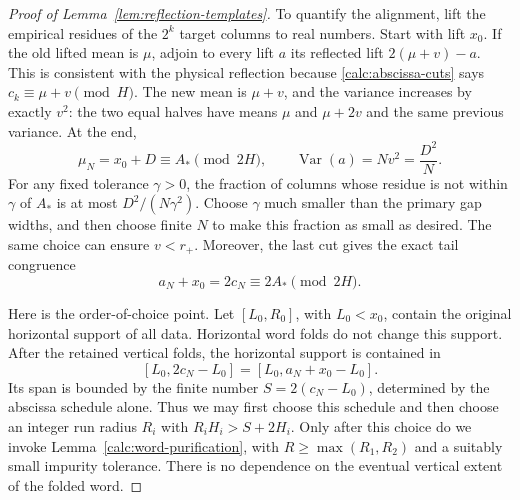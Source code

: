 \begin{proof}[Proof of Lemma~\ref{lem:reflection-templates}]
To quantify the alignment, lift the empirical residues of the
$2^k$ target columns to real numbers. Start with lift $x_0$. If
the old lifted mean is $\mu$, adjoin to every lift $a$ its reflected
lift $2(\mu+v)-a$. This is consistent with the physical reflection
because \eqref{calc:abscissa-cuts} says $c_k\equiv\mu+v\pmod H$.
The new mean is $\mu+v$, and the variance increases by exactly
$v^2$: the two equal halves have means $\mu$ and $\mu+2v$ and
the same previous variance. At the end,
\begin{equation}
 \mu_N=x_0+D\equiv A_*\pmod{2H},
 \qquad \operatorname{Var}(a)=Nv^2=\frac{D^2}{N}.
 \label{calc:abscissa-variance}
\end{equation}
For any fixed tolerance $\gamma>0$, the fraction of columns whose
residue is not within $\gamma$ of $A_*$ is at most
$D^2/(N\gamma^2)$. Choose $\gamma$ much smaller than the primary
gap widths, and then choose finite $N$ to make this fraction as
small as desired. The same choice can ensure $v<r_+$. Moreover,
the last cut gives the exact tail congruence
\begin{equation}
 a_N+x_0=2c_N\equiv2A_*\pmod{2H}.
 \label{calc:abscissa-tail-residue}
\end{equation}

Here is the order-of-choice point. Let $[L_0,R_0]$, with
$L_0<x_0$, contain the original horizontal support of all data.
Horizontal word folds do not change this support. After the
retained vertical folds, the horizontal support is contained in
\[
 [L_0,2c_N-L_0]=[L_0,a_N+x_0-L_0].
\]
Its span is bounded by the finite number $S=2(c_N-L_0)$, determined
by the abscissa schedule alone. Thus we may first choose this
schedule and then choose an integer run radius $R_i$ with
$R_iH_i>S+2H_i$. Only after this choice do we invoke
Lemma~\ref{calc:word-purification}, with
$R\ge\max(R_1,R_2)$ and a suitably small impurity tolerance. There
is no dependence on the eventual vertical extent of the folded
word.


\end{proof}
